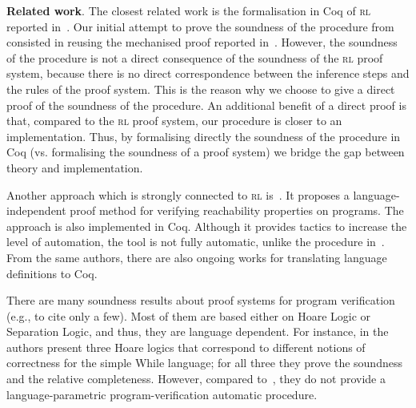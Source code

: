 \documentclass[conference]{IEEEtran}
\newenvironment{todo}{\medskip\hrule\smallskip\noindent}{\smallskip\hrule\medskip}
\renewcommand{\aa}[1]{\begin{todo}\textcolor{OliveGreen}{Andrei:}\\ \color{OliveGreen}{#1}\color{black}\end{todo}}
\renewcommand{\aa}[1]{}
\newcommand{\RL}{\textsc{rl}\xspace}
\begin{document}
{\bf Related work}.
The closest related work is the formalisation in Coq of \RL reported in~\cite{stefanescu-ciobaca-mereuta-moore-serbanuta-rosu-2014-rta}.
Our initial attempt to prove the soundness of the procedure from~\cite{lucanu-rusu-arusoaie-nowak-LRC2015} consisted in reusing the mechanised proof reported in~\cite{stefanescu-ciobaca-mereuta-moore-serbanuta-rosu-2014-rta}. 
However, the soundness of the procedure is not a direct consequence of the soundness of the \RL proof system, because there is no direct correspondence between the inference steps and the rules of the proof system.
This is the reason why we choose to give a direct proof of the soundness of the procedure.
An additional benefit of a direct proof is that, compared to the \RL proof system, our procedure is closer to an implementation.
Thus, by formalising directly the soundness of the procedure in Coq (vs. formalising the soundness of a proof system) we bridge the gap between theory and implementation.

Another approach which is strongly connected to \RL is~\cite{moore-rosu-2015-tr}.
It proposes a language-independent proof method for verifying reachability properties on programs.
The approach is also implemented in Coq. 
Although it provides tactics to increase the level of automation, the tool is not fully automatic, unlike the procedure in~\cite{lucanu-rusu-arusoaie-nowak-LRC2015}. 
From the same authors, there are also ongoing works for translating \K language definitions to Coq.



There are many soundness results about proof systems for program verification (e.g., \cite{Marti:2006:FVH:2105385.2105412, Appel:2014:PLC:2670099, weber04towards, Tuch_Klein_05, schirmer} to cite only a few).
Most of them are based either on Hoare Logic or Separation Logic, and thus, they are language dependent.
For instance, in \cite{weber04towards} the authors present three Hoare logics that correspond to different notions of correctness for the simple While language; for all three they prove the soundness and the relative completeness.
However, compared to~\cite{lucanu-rusu-arusoaie-nowak-LRC2015}, they do not provide a language-parametric program-verification automatic procedure.
\end{document}
